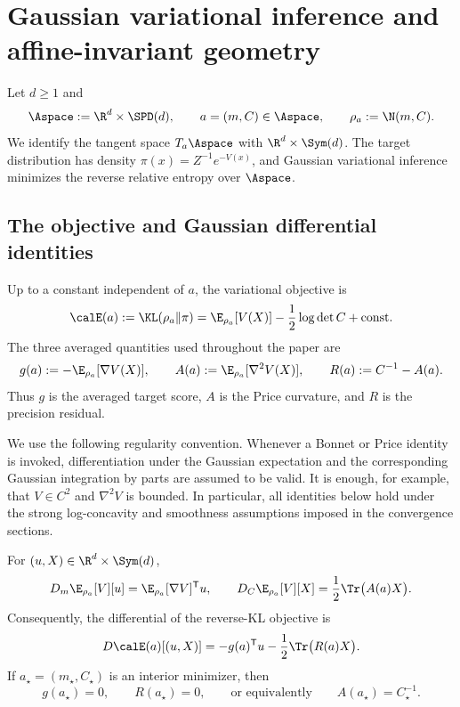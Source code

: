 \section{Gaussian variational inference and affine-invariant geometry}
\label{sec:geometry}

Let $d\geq 1$ and
\[
    \Aspace:=\R^d\times\SPD(d),
    \qquad
    a=(m,C)\in\Aspace,
    \qquad
    \rho_a:=\N(m,C).
\]
We identify the tangent space $T_a\Aspace$ with
$\R^d\times\Sym(d)$.  The target distribution has density
$\pi(x)=Z^{-1}e^{-V(x)}$, and Gaussian variational inference minimizes the
reverse relative entropy over $\Aspace$.

\subsection{The objective and Gaussian differential identities}
\label{sec:geometry-objective}

Up to a constant independent of $a$, the variational objective is
\begin{equation}
\label{eq:geometry-energy}
    \calE(a)
    :=\KL(\rho_a\|\pi)
    =\E_{\rho_a}[V(X)]-\frac12\log\det C+\mathrm{const}.
\end{equation}
The three averaged quantities used throughout the paper are
\begin{equation}
\label{eq:geometry-score-curvature-residual}
    g(a):=-\E_{\rho_a}[\nabla V(X)],
    \qquad
    A(a):=\E_{\rho_a}[\nabla^2V(X)],
    \qquad
    R(a):=C^{-1}-A(a).
\end{equation}
Thus $g$ is the averaged target score, $A$ is the Price curvature, and $R$
is the precision residual.

We use the following regularity convention.  Whenever a Bonnet or Price
identity is invoked, differentiation under the Gaussian expectation and the
corresponding Gaussian integration by parts are assumed to be valid.  It is
enough, for example, that $V\in C^2$ and $\nabla^2V$ is bounded.  In
particular, all identities below hold under the strong log-concavity and
smoothness assumptions imposed in the convergence sections.

\begin{lemma}
\label{lem:geometry-bonnet-price}
For $(u,X)\in\R^d\times\Sym(d)$,
\begin{equation}
\label{eq:geometry-bonnet-price}
    D_m\E_{\rho_a}[V][u]
    =\E_{\rho_a}[\nabla V]^{\mathsf T}u,
    \qquad
    D_C\E_{\rho_a}[V][X]
    =\frac12\Tr\bigl(A(a)X\bigr).
\end{equation}
Consequently, the differential of the reverse-KL objective is
\begin{equation}
\label{eq:geometry-differential}
    D\calE(a)[(u,X)]
    =-g(a)^{\mathsf T}u-\frac12\Tr\bigl(R(a)X\bigr).
\end{equation}
If $a_\star=(m_\star,C_\star)$ is an interior minimizer, then
\begin{equation}
\label{eq:geometry-first-order}
    g(a_\star)=0,
    \qquad
    R(a_\star)=0,
    \qquad\text{or equivalently}\qquad
    A(a_\star)=C_\star^{-1}.
\end{equation}
\end{lemma}

